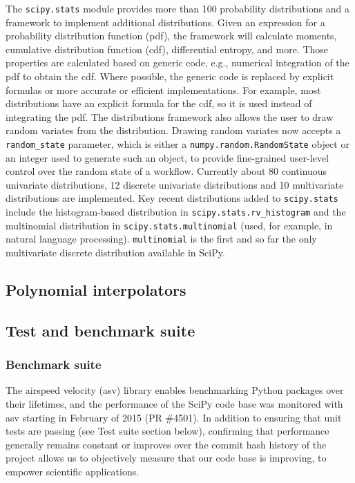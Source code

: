 \documentclass[fleqn,10pt]{wlscirep}
\begin{document}
The \texttt{scipy.stats} module provides more than 100 probability
distributions and a framework to implement additional distributions. Given an
expression for a probability distribution function (pdf), the framework will
calculate moments, cumulative distribution function (cdf), differential
entropy, and more. Those properties are calculated based on generic code, e.g.,
numerical integration of the pdf to obtain the cdf.  Where possible, the
generic code is replaced by explicit formulas or more accurate or efficient
implementations. For example, most distributions have an explicit formula for
the cdf, so it is used instead of integrating the pdf. The distributions
framework also allows the user to draw random variates from the distribution.
Drawing random variates now accepts a \texttt{random\_state} parameter, which
is either a \texttt{numpy.random.RandomState} object or an integer used to
generate such an object, to provide fine-grained user-level control over the
random state of a workflow.  Currently about 80 continuous univariate
distributions, 12 discrete univariate distributions and 10 multivariate
distributions are implemented.  Key recent distributions added to
\texttt{scipy.stats} include the histogram-based distribution in
\texttt{scipy.stats.rv\_histogram} and the multinomial distribution in
\texttt{scipy.stats.multinomial} (used, for example, in natural language
processing\cite{Griffiths5228}). \texttt{multinomial} is the first and so far
the only multivariate discrete distribution available in SciPy.

\subsection*{Polynomial interpolators}



\subsection*{Test and benchmark suite}

\subsubsection*{Benchmark suite}

The airspeed velocity (asv\cite{asvref}) library enables benchmarking Python packages
over their lifetimes, and the performance of the SciPy code base was monitored
with asv starting in February of 2015 (PR \#4501). In addition to ensuring that
unit tests are passing (see Test suite section below), confirming 
that performance generally
remains constant or improves over the commit hash history of the project allows
us to objectively measure that our code base is improving, to empower
scientific applications.
\end{document}
